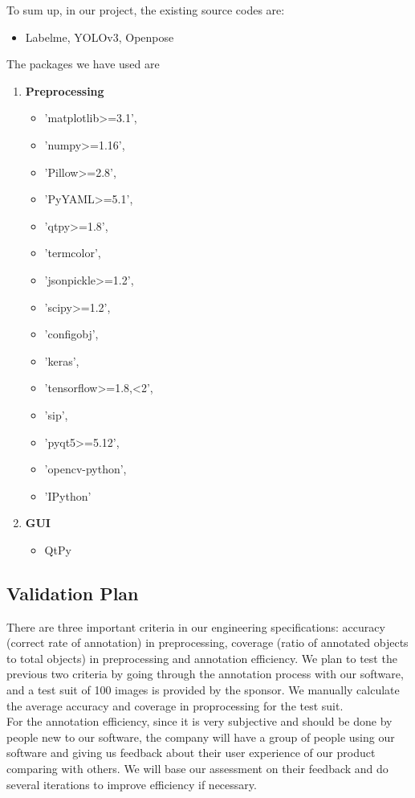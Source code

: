 To sum up, in our project, the existing source codes are:
\begin{itemize}
    \item Labelme\cite{labelme}, YOLOv3\cite{Redmon2018YOLOv3}, Openpose\cite{Cao2016Realtime}
\end{itemize}
The packages we have used are 
\begin{enumerate}
    \item \textbf{Preprocessing} 
    \begin{itemize}
        \item     'matplotlib>=3.1',
         \item 'numpy>=1.16',
        \item  'Pillow>=2.8',
        \item  'PyYAML>=5.1',
    \item 'qtpy>=1.8',
    \item 'termcolor',
    \item 'jsonpickle>=1.2',
    \item 'scipy>=1.2',
     \item 'configobj',
     \item 'keras',
     \item 'tensorflow>=1.8,<2',
     \item 'sip',
     \item 'pyqt5>=5.12',
     \item 'opencv-python',
     \item 'IPython'
       \end{itemize}
    \item \textbf{GUI}
    \begin{itemize}
        \item QtPy
    \end{itemize}
\end{enumerate}
  


\subsection{Validation Plan}
There are three important criteria in our engineering specifications: accuracy (correct rate of annotation) in preprocessing, coverage (ratio of annotated objects to total objects) in preprocessing and annotation efficiency. 
We plan to test the previous two criteria by going through the annotation process with our software, and a test suit of 100 images is provided by the sponsor. We manually calculate the average accuracy and coverage in proprocessing for the test suit.\\
For the annotation efficiency, since it is very subjective and should be done by people new to our software, the company will have a group of people using our software and giving us feedback about their user experience of our product comparing with others. We will base our assessment on their feedback and do several iterations to improve efficiency if necessary.